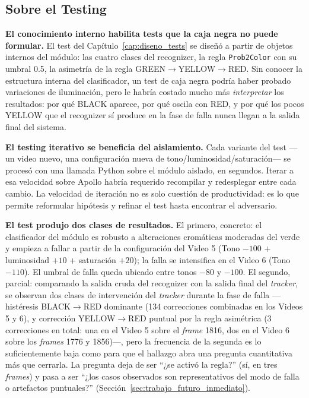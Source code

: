 \subsection{Sobre el Testing}

\textbf{El conocimiento interno habilita tests que la caja negra no puede formular.} El test del Capítulo~\ref{cap:diseno_tests} se diseñó a partir de objetos internos del módulo: las cuatro clases del recognizer, la regla \texttt{Prob2Color} con su umbral 0.5, la asimetría de la regla GREEN$\to$YELLOW$\to$RED. Sin conocer la estructura interna del clasificador, un test de caja negra podría haber probado variaciones de iluminación, pero le habría costado mucho más \textit{interpretar} los resultados: por qué BLACK aparece, por qué oscila con RED, y por qué los pocos YELLOW que el recognizer sí produce en la fase de falla nunca llegan a la salida final del sistema.

\textbf{El testing iterativo se beneficia del aislamiento.} Cada variante del test ---un video nuevo, una configuración nueva de tono/luminosidad/saturación--- se procesó con una llamada Python sobre el módulo aislado, en segundos. Iterar a esa velocidad sobre Apollo habría requerido recompilar y redesplegar entre cada cambio. La velocidad de iteración no es solo cuestión de productividad: es lo que permite reformular hipótesis y refinar el test hasta encontrar el adversario.

\textbf{El test produjo dos clases de resultados.} El primero, concreto: el clasificador del módulo es robusto a alteraciones cromáticas moderadas del verde y empieza a fallar a partir de la configuración del Video 5 (Tono $-100$ + luminosidad $+10$ + saturación $+20$); la falla se intensifica en el Video 6 (Tono $-110$). El umbral de falla queda ubicado entre tonos $-80$ y $-100$. El segundo, parcial: comparando la salida cruda del recognizer con la salida final del \textit{tracker}, se observan dos clases de intervención del \textit{tracker} durante la fase de falla ---histéresis BLACK$\to$RED dominante (134 correcciones combinadas en los Videos 5 y 6), y corrección YELLOW$\to$RED puntual por la regla asimétrica (3 correcciones en total: una en el Video 5 sobre el \textit{frame} 1816, dos en el Video 6 sobre los \textit{frames} 1776 y 1856)---, pero la frecuencia de la segunda es lo suficientemente baja como para que el hallazgo abra una pregunta cuantitativa más que cerrarla. La pregunta deja de ser ``¿se activó la regla?'' (sí, en tres \textit{frames}) y pasa a ser ``¿los casos observados son representativos del modo de falla o artefactos puntuales?'' (Sección~\ref{sec:trabajo_futuro_inmediato}).

